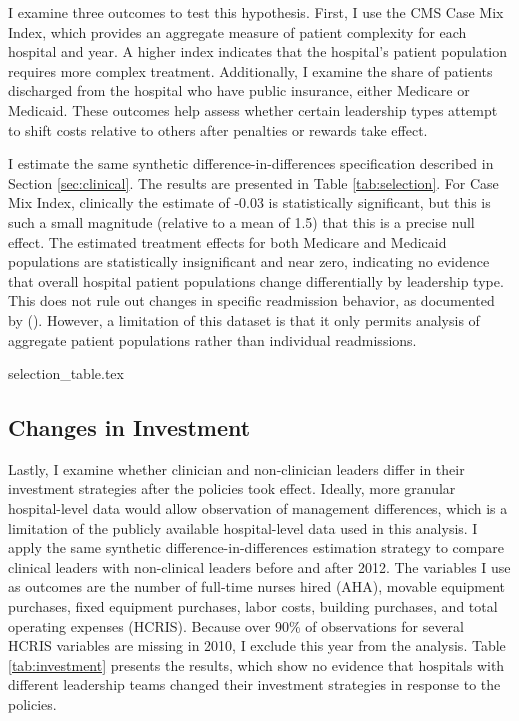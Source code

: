 \documentclass[12pt]{article}
\begin{document}
    I examine three outcomes to test this hypothesis. First, I use the CMS Case Mix Index, which provides an aggregate measure of patient complexity for each hospital and year. A higher index indicates that the hospital’s patient population requires more complex treatment. Additionally, I examine the share of patients discharged from the hospital who have public insurance, either Medicare or Medicaid. These outcomes help assess whether certain leadership types attempt to shift costs relative to others after penalties or rewards take effect.

    I estimate the same synthetic difference-in-differences specification described in Section \ref{sec:clinical}. The results are presented in Table \ref{tab:selection}. For Case Mix Index, clinically the estimate of -0.03 is statistically significant, but this is such a small magnitude (relative to a mean of 1.5) that this is a precise null effect. The estimated treatment effects for both Medicare and Medicaid populations are statistically insignificant and near zero, indicating no evidence that overall hospital patient populations change differentially by leadership type. This does not rule out changes in specific readmission behavior, as documented by \citeauthor{gupta2021impacts} (\citeyear{gupta2021impacts}). However, a limitation of this dataset is that it only permits analysis of aggregate patient populations rather than individual readmissions.

    {selection_table.tex}


    \subsection{Changes in Investment}\label{sec:investment}

    Lastly, I examine whether clinician and non-clinician leaders differ in their investment strategies after the policies took effect. Ideally, more granular hospital-level data would allow observation of management differences, which is a limitation of the publicly available hospital-level data used in this analysis. I apply the same synthetic difference-in-differences estimation strategy to compare clinical leaders with non-clinical leaders before and after 2012. The variables I use as outcomes are the number of full-time nurses hired (AHA), movable equipment purchases, fixed equipment purchases, labor costs, building purchases, and total operating expenses (HCRIS). Because over 90\% of observations for several HCRIS variables are missing in 2010, I exclude this year from the analysis. Table \ref{tab:investment} presents the results, which show no evidence that hospitals with different leadership teams changed their investment strategies in response to the policies.
\end{document}
